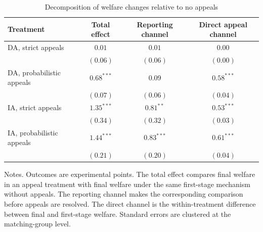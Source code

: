 \begin{table}[htbp]
\centering
\caption{Decomposition of welfare changes relative to no appeals}
\label{tab:welfare_decomposition_rep}
\begin{threeparttable}
\begin{tabular}{lccc}
\toprule
Treatment & Total effect & Reporting channel & Direct appeal channel \\
\midrule
DA, strict appeals & \(0.01\) & \(0.01\) & \(0.00\) \\
& \((0.06)\) & \((0.06)\) & \((0.00)\) \\
DA, probabilistic appeals & \(0.68^{***}\) & \(0.09\) & \(0.58^{***}\) \\
& \((0.07)\) & \((0.06)\) & \((0.04)\) \\
\addlinespace
IA, strict appeals & \(1.35^{***}\) & \(0.81^{**}\) & \(0.53^{***}\) \\
& \((0.34)\) & \((0.32)\) & \((0.03)\) \\
IA, probabilistic appeals & \(1.44^{***}\) & \(0.83^{***}\) & \(0.61^{***}\) \\
& \((0.21)\) & \((0.20)\) & \((0.04)\) \\
\bottomrule
\end{tabular}
\begin{tablenotes}[flushleft]
\footnotesize
\item Notes. Outcomes are experimental points. The total effect compares final welfare in an appeal treatment with final welfare under the same first-stage mechanism without appeals. The reporting channel makes the corresponding comparison before appeals are resolved. The direct channel is the within-treatment difference between final and first-stage welfare. Standard errors are clustered at the matching-group level.
\end{tablenotes}
\end{threeparttable}
\end{table}
